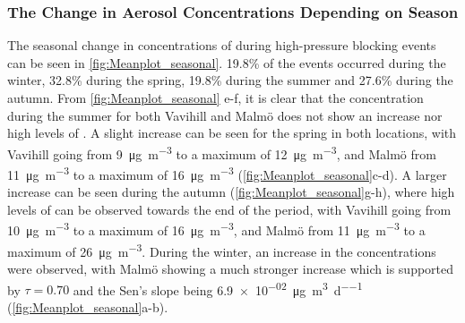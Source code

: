 \newpage 


\subsubsection{The Change in Aerosol Concentrations Depending on Season}
The seasonal change in concentrations of \PM during high-pressure blocking events can be seen in \autoref{fig:Meanplot_seasonal}. 19.8\% of the events occurred during the winter, 32.8\% during the spring, 19.8\% during the summer and 27.6\% during the autumn. From \autoref{fig:Meanplot_seasonal} e-f, it is clear that the concentration during the summer for both Vavihill and Malmö does not show an increase nor high levels of \PM. A slight increase can be seen for the spring in both locations, with Vavihill going from \SI{9}{\micro\gram\per\meter\cubed} to a maximum of \SI{12}{\micro\gram\per\meter\cubed}, and Malmö from \SI{11}{\micro\gram\per\meter\cubed} to a maximum of \SI{16}{\micro\gram\per\meter\cubed} (\autoref{fig:Meanplot_seasonal}c-d). A larger increase can be seen during the autumn (\autoref{fig:Meanplot_seasonal}g-h), where high levels of \PM can be observed towards the end of the period, with Vavihill going from \SI{10}{\micro\gram\per\meter\cubed} to a maximum of \SI{16}{\micro\gram\per\meter\cubed}, and Malmö from \SI{11}{\micro\gram\per\meter\cubed} to a maximum of \SI{26}{\micro\gram\per\meter\cubed}. During the winter, an increase in the \PM concentrations were observed, with Malmö showing a much stronger increase which is supported by $\tau=0.70$ and the Sen's slope being \SI{6.9e-02}{\micro\gram\per\meter\cubed\per\day} (\autoref{fig:Meanplot_seasonal}a-b). 

